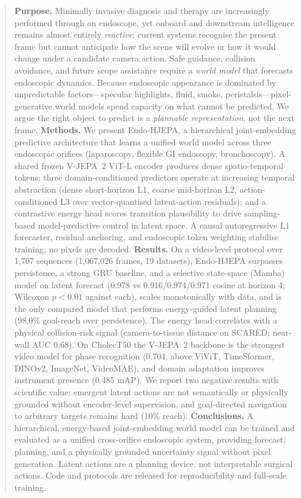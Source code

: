 \documentclass[final,3p,times,twocolumn]{elsarticle}
\begin{document}
\begin{frontmatter}
\begin{abstract}
\textbf{Purpose.} Minimally invasive diagnosis and therapy are increasingly performed through an endoscope, yet onboard and downstream intelligence remains almost entirely \emph{reactive}: current systems recognise the present frame but cannot anticipate how the scene will evolve or how it would change under a candidate camera action. Safe guidance, collision avoidance, and future scope assistance require a \emph{world model} that forecasts endoscopic dynamics. Because endoscopic appearance is dominated by unpredictable factors---specular highlights, fluid, smoke, peristalsis---pixel-generative world models spend capacity on what cannot be predicted. We argue the right object to predict is a \emph{plannable representation}, not the next frame.
\textbf{Methods.} We present Endo-HJEPA, a hierarchical joint-embedding predictive architecture that learns a unified world model across three endoscopic orifices (laparoscopy, flexible GI endoscopy, bronchoscopy). A shared frozen V-JEPA~2 ViT-L encoder produces dense spatio-temporal tokens; three domain-conditioned predictors operate at increasing temporal abstraction (dense short-horizon L1, coarse mid-horizon L2, action-conditioned L3 over vector-quantised latent-action residuals); and a contrastive energy head scores transition plausibility to drive sampling-based model-predictive control in latent space. A causal autoregressive L1 forecaster, residual anchoring, and endoscopic token weighting stabilise training; no pixels are decoded.
\textbf{Results.} On a video-level protocol over 1,707 sequences (1,067,026 frames, 19 datasets), Endo-HJEPA surpasses persistence, a strong GRU baseline, and a selective state-space (Mamba) model on latent forecast (0.978 vs 0.916/0.974/0.971 cosine at horizon 4; Wilcoxon $p<0.01$ against each), scales monotonically with data, and is the only compared model that performs energy-guided latent planning (98.0\% goal-reach over persistence). The energy head correlates with a physical collision-risk signal (camera-to-tissue distance on SCARED; near-wall AUC 0.68). On CholecT50 the V-JEPA~2 backbone is the strongest video model for phase recognition (0.704, above ViViT, TimeSformer, DINOv2, ImageNet, VideoMAE), and domain adaptation improves instrument presence (0.485 mAP). We report two negative results with scientific value: emergent latent actions are not semantically or physically grounded without encoder-level supervision, and goal-directed navigation to arbitrary targets remains hard (10\% reach).
\textbf{Conclusions.} A hierarchical, energy-based joint-embedding world model can be trained and evaluated as a unified cross-orifice endoscopic system, providing forecast, planning, and a physically grounded uncertainty signal without pixel generation. Latent actions are a planning device, not interpretable surgical actions. Code and protocols are released for reproducibility and full-scale training.
\end{abstract}


\end{frontmatter}
\end{document}
